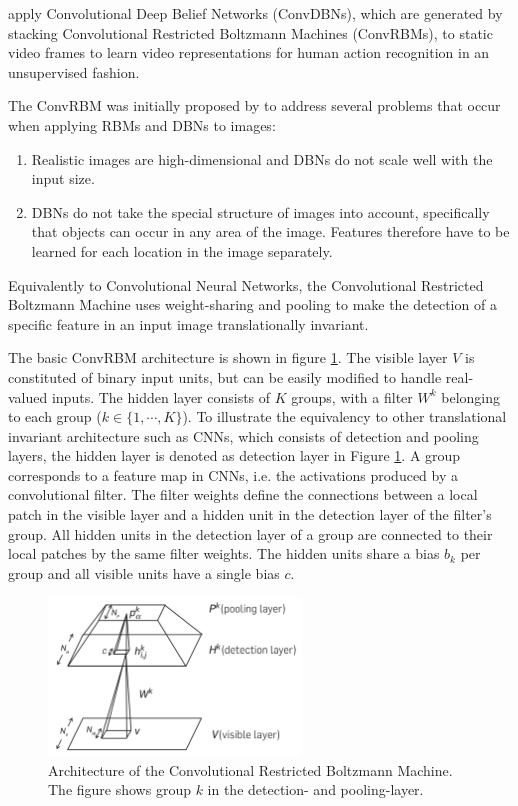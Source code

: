 \textcite{palasek_action_2016} apply Convolutional Deep Belief Networks (ConvDBNs), which are generated by stacking Convolutional Restricted Boltzmann Machines (ConvRBMs), to static video frames to learn video representations for human action recognition in an unsupervised fashion.

The ConvRBM was initially proposed by \textcite{lee_convolutional_2009-1} to address several problems that occur when applying RBMs and DBNs to images:
\begin{enumerate}
    \item Realistic images are high-dimensional and DBNs do not scale well with the input size. \cite{lee_convolutional_2009-1} 
    \item DBNs do not take the special structure of images into account, specifically that objects can occur in any area of the image. Features therefore have to be learned for each location in the image separately. \cite{lee_convolutional_2009-1} 
\end{enumerate}

Equivalently to Convolutional Neural Networks, the Convolutional Restricted Boltzmann Machine uses weight-sharing and pooling to make the detection of a specific feature in an input image translationally invariant.

The basic ConvRBM architecture is shown in figure \ref{fig:convrbm_architecture}.
The visible layer $V$ is constituted of binary input units, but can be easily modified to handle real-valued inputs.
The hidden layer consists of $K$ groups, with a filter $W^k$ belonging to each group ($k \in \{1,\cdots, K\}$).
To illustrate the equivalency to other translational invariant architecture such as CNNs, which consists of detection and pooling layers, the hidden layer is denoted as detection layer in Figure \ref{fig:convrbm_architecture}.
A group corresponds to a feature map in CNNs, i.e. the activations produced by a convolutional filter.
The filter weights define the connections between a local patch in the visible layer and a hidden unit in the detection layer of the filter's group.
All hidden units in the detection layer of a group are connected to their local patches by the same filter weights.
The hidden units share a bias $b_k$ per group and all visible units have a single bias $c$.
\cite{lee_convolutional_2009-1}

\begin{figure}[H]
    \centering
    \includegraphics[width=0.6\textwidth]{img_deep/convrbm_architecture}
    \caption{Architecture of the Convolutional Restricted Boltzmann Machine. The figure shows group $k$ in the detection- and pooling-layer. \cite{lee_convolutional_2009-1}}
    \label{fig:convrbm_architecture}
\end{figure}

